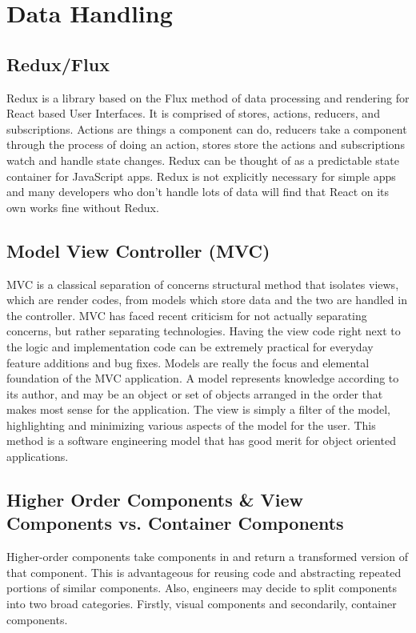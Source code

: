 \documentclass[titlepage,onecolumn]{article}
\begin{document}
\section{Data Handling}

\subsection{Redux/Flux}
Redux is a library based on the Flux method of data processing and rendering for React based User Interfaces. It is comprised of stores, actions, reducers, and subscriptions. Actions are things a component can do, reducers take a component through the process of doing an action, stores store the actions and subscriptions watch and handle state changes. Redux can be thought of as a predictable state container for JavaScript apps. Redux is not explicitly necessary for simple apps and many developers who don't handle lots of data will find that React on its own works fine without Redux. 

\subsection{Model View Controller (MVC)}
MVC is a classical separation of concerns structural method that isolates views, which are render codes, from models which store data and the two are handled in the controller. MVC has faced recent criticism for not actually separating concerns, but rather separating technologies. Having the view code right next to the logic and implementation code can be extremely practical for everyday feature additions and bug fixes. Models are really the focus and elemental foundation of the MVC application. A model represents knowledge according to its author, and may be an object or set of objects arranged in the order that makes most sense for the application. The view is simply a filter of the model, highlighting and minimizing various aspects of the model for the user. This method is a software engineering model that has good merit for object oriented applications.

\subsection{Higher Order Components \& View Components vs. Container Components}
Higher-order components take components in and return a transformed version of that component. This is advantageous for reusing code and abstracting repeated portions of similar components. Also, engineers may decide to split components into two broad categories. Firstly, visual components and secondarily, container components.
\end{document}
